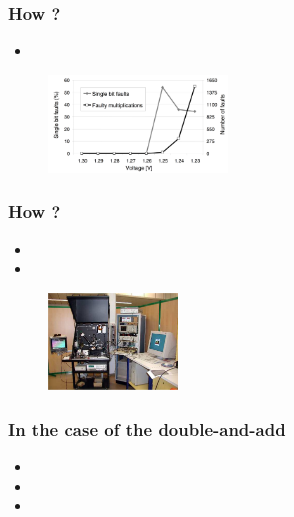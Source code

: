 \documentclass{beamer}
\begin{document}
    \begin{frame}
        \frametitle{How ?}
            \begin{itemize}
                \item {}
            \end{itemize}
            
            \begin{figure}
                \centering
                \includegraphics[width=180px]{img/power_disturbation}
            \end{figure}

    \end{frame}

    \begin{frame}
        \frametitle{How ?}
            \begin{itemize}
                \item {}
                \item \color{black}{With a laser}
            \end{itemize}
            
            \begin{figure}
                \centering
                \includegraphics[width=130px]{img/laser}
            \end{figure}

    \end{frame}

    \begin{frame}
        \frametitle{In the case of the double-and-add}

            \begin{itemize}
                \item \color{black}{Modification of a register}
                \item \color{black}{$\Rightarrow$ impact on one of the coordinates}
                \item \color{black}{Bit flip}
            \end{itemize}

    \end{frame}
\end{document}
